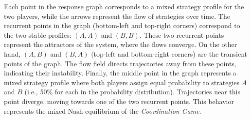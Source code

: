         \noindent
        Each point in the response graph corresponds to a mixed strategy profile for the two players, while the arrows represent the flow of strategies over time. The recurrent points in the graph (bottom-left and top-right corners) correspond to the two stable profiles: $(A,A)$ and $(B,B)$. These two recurrent points represent the attractors of the system, where the flows converge. On the other hand, $(A,B)$ and $(B,A)$ (top-left and bottom-right corners) are the transient points of the graph. The flow field directs trajectories away from these points, indicating their instability. Finally, the middle point in the graph represents a mixed strategy profile where both players assign equal probability to strategies $A$ and $B$ (i.e., 50\% for each in the probability distribution). Trajectories near this point diverge, moving towards one of the two recurrent points. This behavior represents the mixed Nash equilibrium of the \emph{Coordination Game}.
